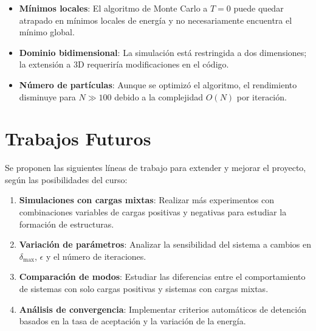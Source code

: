 \begin{itemize}
    \item \textbf{Mínimos locales}: El algoritmo de Monte Carlo a \(T = 0\) puede quedar atrapado en mínimos locales de energía y no necesariamente encuentra el mínimo global.
    \item \textbf{Dominio bidimensional}: La simulación está restringida a dos dimensiones; la extensión a 3D requeriría modificaciones en el código.
    \item \textbf{Número de partículas}: Aunque se optimizó el algoritmo, el rendimiento disminuye para \(N \gg 100\) debido a la complejidad \(O(N)\) por iteración.
\end{itemize}

\section{Trabajos Futuros}
Se proponen las siguientes líneas de trabajo para extender y mejorar el proyecto, según las posibilidades del curso:

\begin{enumerate}
    \item \textbf{Simulaciones con cargas mixtas}: Realizar más experimentos con combinaciones variables de cargas positivas y negativas para estudiar la formación de estructuras.
    \item \textbf{Variación de parámetros}: Analizar la sensibilidad del sistema a cambios en \(\delta_{\text{max}}\), \(\epsilon\) y el número de iteraciones.
    \item \textbf{Comparación de modos}: Estudiar las diferencias entre el comportamiento de sistemas con solo cargas positivas y sistemas con cargas mixtas.
    \item \textbf{Análisis de convergencia}: Implementar criterios automáticos de detención basados en la tasa de aceptación y la variación de la energía.
\end{enumerate}
